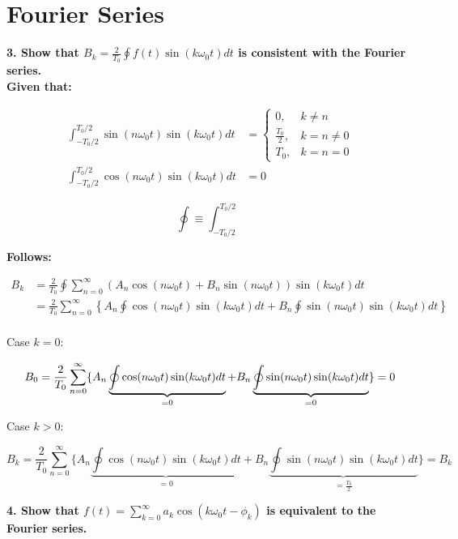 \section*{Fourier Series}
\textbf{\large 3. Show that $B_k = \frac{2}{T_0} \oint f(t) \sin(k \omega_0 t) dt$ is consistent with the Fourier series.}
\\

\textbf{Given that:}

\begin{align}
	\int_{-T_0/2}^{T_0/2} \sin(n \omega_0 t) \sin(k \omega_0 t) dt &=
	\begin{cases}
		0,& k \neq n\\
		\frac{T_0}{2},& k = n \neq 0\\
		T_0,& k = n = 0
	\end{cases}
	\\
	\int_{-T_0/2}^{T_0/2} \cos(n \omega_0 t) \sin(k \omega_0 t) dt &= 0 
\end{align}

\begin{equation}
	\oint \equiv \int_{-T_0/2}^{T_0/2}
\end{equation}

\textbf{Follows:}

\begin{align*}
	B_k &= \frac{2}{T_0} \oint \sum_{n=0}^\infty \left(A_n \cos(n \omega_0 t) + B_n \sin(n \omega_0 t) \right) \sin(k \omega_0 t) dt \\
	&= \frac{2}{T_0} \sum_{n=0}^\infty \left\{A_n \oint \cos(n \omega_0 t) \sin(k \omega_0 t) dt + B_n \oint \sin(n \omega_0 t) \sin(k \omega_0 t) dt \right\} \\
\end{align*}

Case $k = 0$:

\[
	B_0 = \frac{2}{T_0} \sum_{n=0}^\infty \{A_n \underbrace{\oint \cos(n \omega_0 t) \sin(k \omega_0 t) dt}_{=0} + B_n \underbrace{\oint \sin(n \omega_0 t) \sin(k \omega_0 t) dt}_{=0} \} = 0\\
\]

Case $k > 0$:

\[
	B_k = \frac{2}{T_0} \sum_{n=0}^\infty \{A_n \underbrace{\oint \cos(n \omega_0 t) \sin(k \omega_0 t) dt}_{=0} + B_n \underbrace{\oint \sin(n \omega_0 t) \sin(k \omega_0 t) dt}_{=\frac{T_0}{2}} \} = B_k
\]

\textbf{\large 4. Show that $f(t) = \sum_{k=0}^\infty a_k \cos(k \omega_0 t - \phi_k)$ is equivalent to the Fourier series.}
\\

